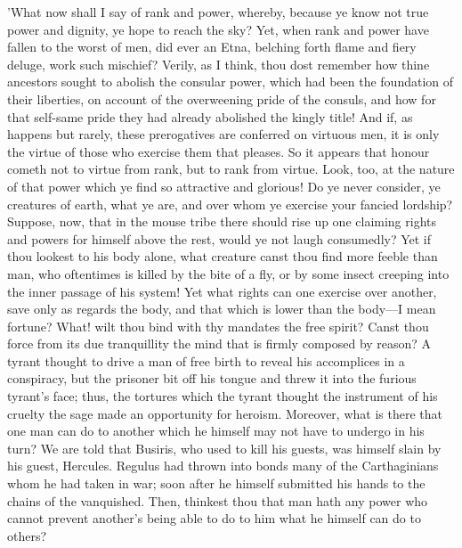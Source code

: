 'What now shall I say of rank and power, whereby, because ye know not
true power and dignity, ye hope to reach the sky? Yet, when rank and
power have fallen to the worst of men, did ever an Etna, belching forth
flame and fiery deluge, work such mischief? Verily, as I think, thou
dost remember how thine ancestors sought to abolish the consular power,
which had been the foundation of their liberties, on account of the
overweening pride of the consuls, and how for that self-same pride they
had already abolished the kingly title! And if, as happens but rarely,
these prerogatives are conferred on virtuous men, it is only the virtue
of those who exercise them that pleases. So it appears that honour
cometh not to virtue from rank, but to rank from virtue. Look, too, at
the nature of that power which ye find so attractive and glorious! Do ye
never consider, ye creatures of earth, what ye are, and over whom ye
exercise your fancied lordship? Suppose, now, that in the mouse tribe
there should rise up one claiming rights and powers for himself above
the rest, would ye not laugh consumedly? Yet if thou lookest to his body
alone, what creature canst thou find more feeble than man, who
oftentimes is killed by the bite of a fly, or by some insect creeping
into the inner passage of his system! Yet what rights can one exercise
over another, save only as regards the body, and that which is lower
than the body—I mean fortune? What! wilt thou bind with thy mandates
the free spirit? Canst thou force from its due tranquillity the mind
that is firmly composed by reason? A tyrant thought to drive a man of
free birth to reveal his accomplices in a conspiracy, but the prisoner
bit off his tongue and threw it into the furious tyrant's face; thus,
the tortures which the tyrant thought the instrument of his cruelty the
sage made an opportunity for heroism. Moreover, what is there that one
man can do to another which he himself may not have to undergo in his
turn? We are told that Busiris, who used to kill his guests, was himself
slain by his guest, Hercules. Regulus had thrown into bonds many of the
Carthaginians whom he had taken in war; soon after he himself submitted
his hands to the chains of the vanquished. Then, thinkest thou that man
hath any power who cannot prevent another's being able to do to him what
he himself can do to others?

